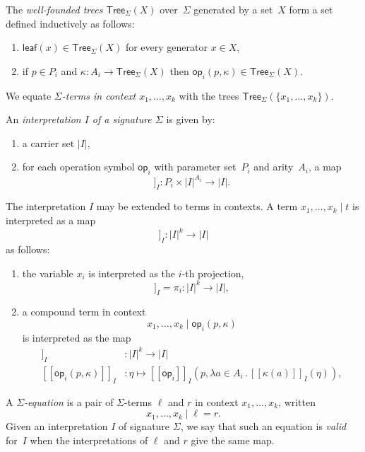 \documentclass{amsart}
\newcommand{\set}[1]{\{#1\}} %
\newcommand{\lam}[1]{\lambda #1 \,.\,}
\newcommand{\Tree}[2]{\mathsf{Tree}_{#1}(#2)} %
\newcommand{\leaf}[1]{\mathsf{leaf}(#1)} %
\newcommand{\op}[1]{\mathsf{op}_{#1}} %
\newcommand{\sem}[1]{[\![#1]\!]} %
\begin{document}
The \emph{well-founded trees $\Tree{\Sigma}{X}$} over~$\Sigma$ generated by a
set~$X$ form a set defined inductively as follows:
%
\begin{enumerate}
\item $\leaf{x} \in \Tree{\Sigma}{X}$ for every generator $x \in X$,
\item if $p \in P_i$ and $\kappa : A_i \to \Tree{\Sigma}{X}$ then
  $\op{i}(p, \kappa) \in \Tree{\Sigma}{X}$.
\end{enumerate}
%
We equate \emph{$\Sigma$-terms in context $x_1, \ldots, x_k$} with the trees
$\Tree{\Sigma}{\set{x_1, \ldots, x_k}}$.

An \emph{interpretation $I$ of a signature $\Sigma$} is given by:
%
\begin{enumerate}
\item a carrier set $|I|$,
\item for each operation symbol $\op{i}$ with parameter set~$P_i$ and arity~$A_i$,
  a map
  \begin{equation*}
    \sem{\op{i}}_I : P_i \times |I|^{A_i} \longrightarrow |I|.
  \end{equation*}
\end{enumerate}
%
The interpretation $I$ may be extended to terms in contexts. A term
$x_1, \ldots, x_k \mid t$ is interpreted as a map
%
\begin{equation*}
  \sem{x_1, \ldots, x_k \mid t}_I : |I|^k \to |I|
\end{equation*}
%
as follows:
%
\begin{enumerate}
\item the variable $x_i$ is interpreted as the $i$-th projection,
  \begin{equation*}
    \sem{x_0, \ldots, x_{k-1} \mid  x_i}_I = \pi_i : |I|^k \to |I|,
  \end{equation*}
\item a compound term in context
  \begin{equation*}
    x_1, \ldots, x_k \mid \op{i}(p, \kappa)
  \end{equation*}
  is interpreted as the map
  \begin{align*}
    \sem{\op{i}(p, \kappa)}_I &: |I|^k \longrightarrow |I| \\
    \sem{\op{i}(p, \kappa)}_I &:
      \eta \mapsto
      \sem{\op{i}}_I(p, \lam{a \in A_i} \sem{\kappa(a)}_I(\eta)),
  \end{align*}
\end{enumerate}

A \emph{$\Sigma$-equation} is a pair of $\Sigma$-terms $\ell$ and $r$ in context
$x_1, \ldots, x_k$, written
%
\begin{equation*}
  x_1, \ldots, x_k \mid \ell = r.
\end{equation*}
%
Given an interpretation $I$ of signature $\Sigma$, we say that such an equation
is \emph{valid} for~$I$ when the interpretations of $\ell$ and $r$ give the same
map.
\end{document}
